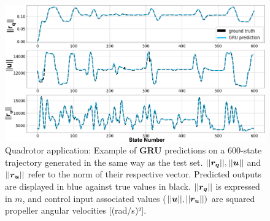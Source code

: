 \begin{figure}[h!]
    \centering
    \includegraphics[width=0.9\linewidth]{figures/learning_quadrotor/long_pred.png}
    \caption{Quadrotor application: Example of \textbf{GRU} predictions on a 600-state trajectory generated in the same way as the test set. $||\boldsymbol{r_q}||, ||\boldsymbol{u}||$ and $||\boldsymbol{r_u}||$ refer to the norm of their respective vector. 
    Predicted outputs are displayed in blue against true values in black. $||\boldsymbol{r_q}||$ is expressed in $m$, and control input associated values ($||\boldsymbol{u}||,||\boldsymbol{r_u}||)$ are squared propeller angular velocities [(rad/s)²].}
    \label{fig:long_test}
\end{figure}

